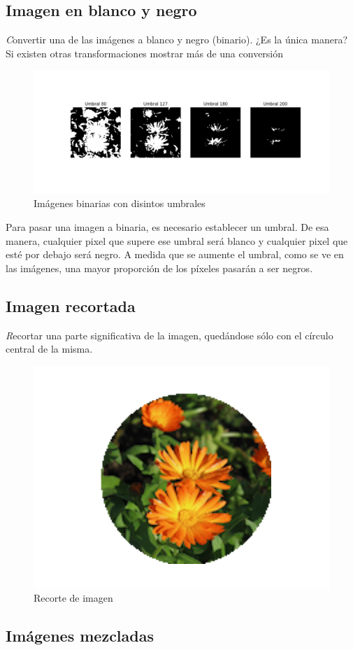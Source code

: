 \documentclass{article}
\begin{document}
\subsection{Imagen en blanco y negro}

{\emph Convertir una de las imágenes a blanco y negro (binario). ¿Es la única manera? Si existen otras transformaciones mostrar más de una conversión}

\begin{figure}[h!]
  \centering    
  \includegraphics[width=.75 \textwidth]{3_binario.png}
  \caption{Imágenes binarias con disintos umbrales}
\end{figure}

Para pasar una imagen a binaria, es necesario establecer un umbral. De esa manera, cualquier pixel que supere ese umbral será blanco y cualquier pixel que esté por
debajo será negro. A medida que se aumente el umbral, como se ve en las imágenes, una mayor proporción de los píxeles pasarán a ser negros.

\subsection{Imagen recortada}
\label{others}

{\emph Recortar una parte significativa de la imagen, quedándose sólo con el círculo central de la misma.}

\begin{figure}[h!]
  \centering    
  \includegraphics[width=.3\textwidth]{4_recortado.png}
  \caption{Recorte de imagen}
\end{figure}
\subsection{Imágenes mezcladas}
\end{document}
